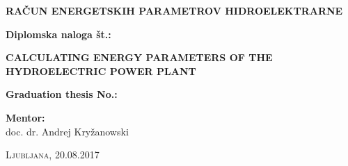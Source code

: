 \begin{minipage}{\textwidth}
\begin{center}
\vspace*{2cm}

\begin{Large}
\textbf{RAČUN ENERGETSKIH PARAMETROV HIDROELEKTRARNE}
\end{Large}

\vspace*{0.5cm}

\begin{large}
\textbf{Diplomska naloga št.:}
\end{large}

\vspace*{1.5cm}

\begin{Large}
	\textbf{CALCULATING ENERGY PARAMETERS OF THE HYDROELECTRIC POWER PLANT}
\end{Large}

\vspace*{0.5cm}

\begin{large}
	\textbf{Graduation thesis No.:}
\end{large}



\end{center}
\vspace*{8cm}


\begin{large}
	\textbf{Mentor:}\\
	doc. dr. Andrej Kryžanowski \\
\end{large}

\begin{center}
\textsc{Ljubljana, 20.08.2017}
\end{center}

\end{minipage}

\newpage
\thispagestyle{empty}
\cleardoublepage